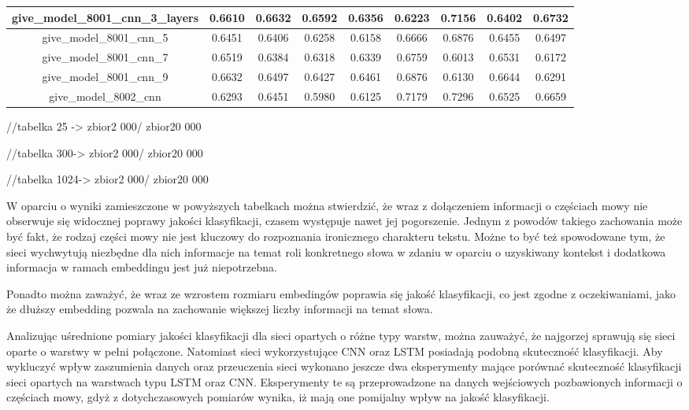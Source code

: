 \begin{table}[!h]
\begin{tabular}{|c|c|c|c|c|c|c|c|c|}
        give\_model\_8001\_cnn\_3\_layers & 0.6610                        & 0.6632                         & 0.6592                      & 0.6356                  & 0.6223 & 0.7156 & 0.6402 & 0.6732 \\ \hline
        give\_model\_8001\_cnn\_5         & 0.6451                        & 0.6406                         & 0.6258                      & 0.6158                  & 0.6666 & 0.6876 & 0.6455 & 0.6497 \\ \hline
        give\_model\_8001\_cnn\_7         & 0.6519                        & 0.6384                         & 0.6318                      & 0.6339                  & 0.6759 & 0.6013 & 0.6531 & 0.6172 \\ \hline
        give\_model\_8001\_cnn\_9         & 0.6632                        & 0.6497                         & 0.6427                      & 0.6461                  & 0.6876 & 0.6130 & 0.6644 & 0.6291 \\ \hline
        give\_model\_8002\_cnn            & 0.6293                        & 0.6451                         & 0.5980                      & 0.6125                  & 0.7179 & 0.7296 & 0.6525 & 0.6659 \\ \hline
    \end{tabular}
\end{table}

//tabelka 25 -> zbior2 000/ zbior20 000

//tabelka 300-> zbior2 000/ zbior20 000

//tabelka 1024-> zbior2 000/ zbior20 000

W oparciu o wyniki zamieszczone w powyższych tabelkach można stwierdzić, że wraz z dołączeniem informacji o częściach mowy nie obserwuje się widocznej poprawy jakości klasyfikacji, czasem występuje nawet jej pogorszenie. Jednym z powodów takiego zachowania może być fakt, że rodzaj części mowy nie jest kluczowy do rozpoznania ironicznego charakteru tekstu. Możne to być też spowodowane tym, że sieci wychwytują niezbędne dla nich informacje na temat roli konkretnego słowa w zdaniu w oparciu o uzyskiwany kontekst i dodatkowa informacja w ramach embeddingu jest już niepotrzebna.

Ponadto można zaważyć, że wraz ze wzrostem rozmiaru embedingów poprawia się jakość klasyfikacji, co jest zgodne z oczekiwaniami, jako że dłuższy embedding pozwala na zachowanie większej liczby informacji na temat słowa.


Analizując uśrednione pomiary jakości klasyfikacji dla sieci opartych o różne typy warstw, można zauważyć, że najgorzej sprawują się sieci oparte o warstwy w pełni połączone. Natomiast sieci wykorzystujące CNN oraz LSTM posiadają podobną skuteczność klasyfikacji. Aby wykluczyć wpływ zaszumienia danych oraz przeuczenia sieci wykonano jeszcze dwa eksperymenty mające porównać skuteczność klasyfikacji sieci opartych na warstwach typu LSTM oraz CNN. Eksperymenty te są przeprowadzone na danych wejściowych pozbawionych informacji o częściach mowy, gdyż z dotychczasowych pomiarów wynika, iż mają one pomijalny wpływ na jakość klasyfikacji.


